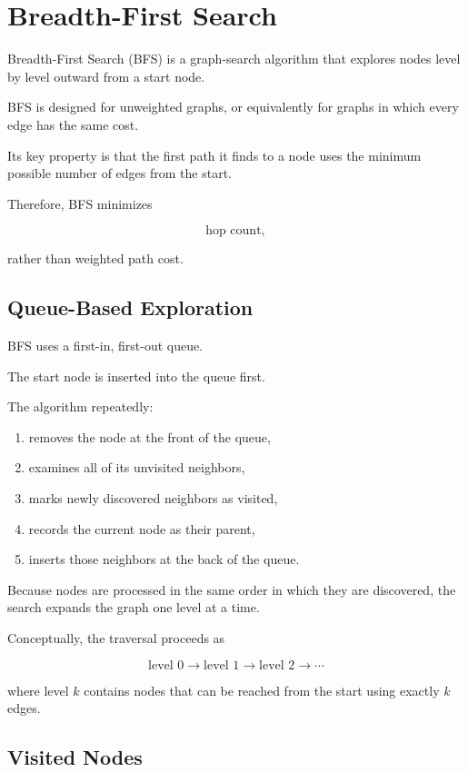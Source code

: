 \section{Breadth-First Search}

Breadth-First Search (BFS) is a graph-search algorithm that explores nodes
level by level outward from a start node.

BFS is designed for unweighted graphs, or equivalently for graphs in which
every edge has the same cost.

Its key property is that the first path it finds to a node uses the minimum
possible number of edges from the start.

Therefore, BFS minimizes

\[
\text{hop count},
\]

rather than weighted path cost.

\subsection{Queue-Based Exploration}

BFS uses a first-in, first-out queue.

The start node is inserted into the queue first.

The algorithm repeatedly:

\begin{enumerate}
    \item removes the node at the front of the queue,
    \item examines all of its unvisited neighbors,
    \item marks newly discovered neighbors as visited,
    \item records the current node as their parent,
    \item inserts those neighbors at the back of the queue.
\end{enumerate}

Because nodes are processed in the same order in which they are discovered,
the search expands the graph one level at a time.

Conceptually, the traversal proceeds as

\[
\text{level }0
\rightarrow
\text{level }1
\rightarrow
\text{level }2
\rightarrow
\cdots
\]

where level $k$ contains nodes that can be reached from the start using
exactly $k$ edges.

\subsection{Visited Nodes}

